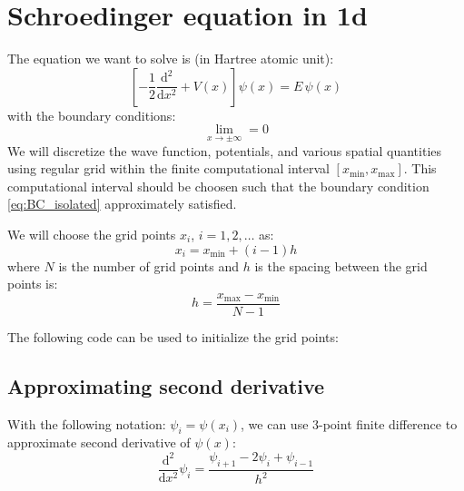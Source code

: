 \chapter{Schroedinger equation in 1d}

The equation we want to solve is (in Hartree atomic unit):
\begin{equation}
\left[ -\frac{1}{2}\frac{\mathrm{d}^2}{\mathrm{d}x^2} + V(x) \right] \psi(x) = E\, \psi(x)
\end{equation}
with the boundary conditions:
\begin{equation}
\lim_{x \rightarrow \pm \infty} = 0
\label{eq:BC_isolated}
\end{equation}
%
We will discretize the wave function, potentials, and various spatial quantities using
regular grid within the finite computational interval
$\left[x_{\mathrm{min}}, x_{\mathrm{max}}\right]$. This computational interval should be choosen
such that the boundary condition \ref{eq:BC_isolated} approximately satisfied.

We will choose the grid points $x_{i}$, $i = 1, 2, \ldots$ as:
\begin{equation}
x_{i} = x_{\mathrm{min}} + (i-1)h
\end{equation}
where $N$ is the number of grid points and $h$ is the spacing between the grid points
is:
\begin{equation}
h = \frac{ x_{\mathrm{max}} - x_{\mathrm{min}} }{N-1}
\end{equation}

The following code can be used to initialize the grid points:



\section{Approximating second derivative}

With the following notation: $\psi_{i} = \psi(x_{i})$, we can use 3-point
finite difference to approximate second derivative of $\psi(x)$:
\begin{equation}
\frac{\mathrm{d}^2}{\mathrm{d}x^2} \psi_{i} =
\frac{\psi_{i+1} - 2\psi_{i} + \psi_{i-1}}{h^2}
\end{equation}


